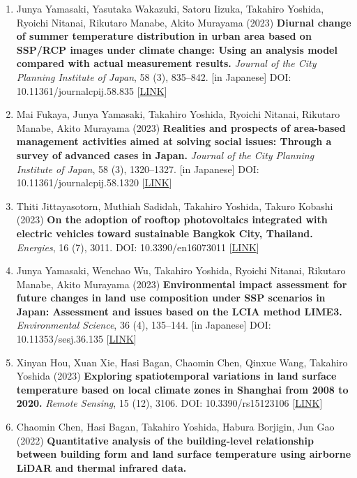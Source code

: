 \documentclass[
]{book}
\begin{document}
\begin{enumerate}
  DOI: 10.1080/15481603.2023.2209970 {[}\href{https://www.tandfonline.com/doi/full/10.1080/15481603.2023.2209970}{LINK}{]}
\item
  Junya Yamasaki, Yasutaka Wakazuki, Satoru Iizuka, Takahiro Yoshida, Ryoichi Nitanai, Rikutaro Manabe, Akito Murayama (2023)
  \textbf{Diurnal change of summer temperature distribution in urban area based on SSP/RCP images under climate change: Using an analysis model compared with actual measurement results.}
  \emph{Journal of the City Planning Institute of Japan}, 58 (3), 835--842. {[}in Japanese{]}
  DOI: 10.11361/journalcpij.58.835 {[}\href{https://doi.org/10.11361/journalcpij.58.835}{LINK}{]}
\item
  Mai Fukaya, Junya Yamasaki, Takahiro Yoshida, Ryoichi Nitanai, Rikutaro Manabe, Akito Murayama (2023)
  \textbf{Realities and prospects of area-based management activities aimed at solving social issues: Through a survey of advanced cases in Japan.}
  \emph{Journal of the City Planning Institute of Japan}, 58 (3), 1320--1327. {[}in Japanese{]}
  DOI: 10.11361/journalcpij.58.1320 {[}\href{https://doi.org/10.11361/journalcpij.58.1320}{LINK}{]}
\item
  Thiti Jittayasotorn, Muthiah Sadidah, Takahiro Yoshida, Takuro Kobashi (2023)
  \textbf{On the adoption of rooftop photovoltaics integrated with electric vehicles toward sustainable Bangkok City, Thailand.}
  \emph{Energies}, 16 (7), 3011.
  DOI: 10.3390/en16073011 {[}\href{https://www.mdpi.com/1996-1073/16/7/3011}{LINK}{]}
\item
  Junya Yamasaki, Wenchao Wu, Takahiro Yoshida, Ryoichi Nitanai, Rikutaro Manabe, Akito Murayama (2023)
  \textbf{Environmental impact assessment for future changes in land use composition under SSP scenarios in Japan: Assessment and issues based on the LCIA method LIME3.}
  \emph{Environmental Science}, 36 (4), 135--144. {[}in Japanese{]}
  DOI: 10.11353/sesj.36.135 {[}\href{https://doi.org/10.11353/sesj.36.135}{LINK}{]}
\item
  Xinyan Hou, Xuan Xie, Hasi Bagan, Chaomin Chen, Qinxue Wang,
  Takahiro Yoshida (2023)
  \textbf{Exploring spatiotemporal variations in land surface temperature based on local climate zones in Shanghai from 2008 to 2020.}
  \emph{Remote Sensing}, 15 (12), 3106.
  DOI: 10.3390/rs15123106 {[}\href{https://www.mdpi.com/2072-4292/15/12/3106}{LINK}{]}
\item
  Chaomin Chen, Hasi Bagan, Takahiro Yoshida, Habura Borjigin, Jun Gao (2022)
  \textbf{Quantitative analysis of the building-level relationship between building form and land surface temperature using airborne LiDAR and thermal infrared data.}

\end{enumerate}
\end{document}
